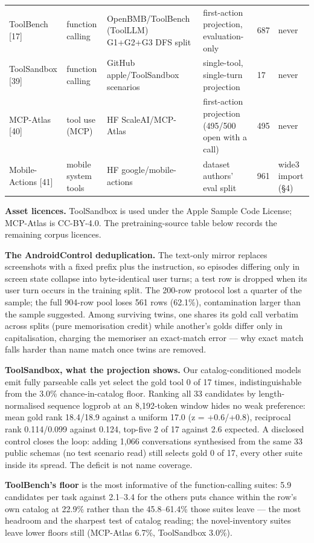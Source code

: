 \documentclass{article}
\begin{document}
\begin{table}[htbp]
\begin{tabularx}{\textwidth}{ll>{\raggedright\arraybackslash}X>{\raggedright\arraybackslash}Xll}
ToolBench [17] & function calling & OpenBMB/ToolBench (ToolLLM) G1+G2+G3 DFS split & first-action projection, evaluation-only & 687 & never \\
ToolSandbox [39] & function calling & GitHub {\scriptsize apple/ToolSandbox} scenarios & single-tool, single-turn projection & 17 & never \\
MCP-Atlas [40] & tool use (MCP) & HF {\scriptsize ScaleAI/MCP-Atlas} & first-action projection (495/500 open with a call) & 495 & never \\
Mobile-Actions [41] & mobile system tools & HF {\scriptsize google/mobile-actions} & dataset authors' eval split & 961 & wide3 import (\S4) \\
\bottomrule
\end{tabularx}
\end{table}


\textbf{Asset licences.} ToolSandbox is used under the Apple Sample Code License; MCP-Atlas is
CC-BY-4.0. The pretraining-source table below records the remaining corpus licences.


\textbf{The AndroidControl deduplication.} The text-only mirror replaces screenshots with a
fixed prefix plus the instruction, so episodes differing only in screen state collapse into
byte-identical user turns; a test row is dropped when its user turn occurs in the training
split. The 200-row protocol lost a quarter of the sample; the full 904-row pool loses
561 rows (62.1\%), contamination larger than the sample suggested. Among surviving twins, one
shares its gold call verbatim across splits (pure memorisation credit) while another's golds
differ only in capitalisation, charging the memoriser an exact-match error --- why exact
match falls harder than name match once twins are removed.


\textbf{ToolSandbox, what the projection shows.} Our catalog-conditioned models emit fully parseable calls yet select the gold tool 0 of 17 times, indistinguishable from the 3.0\% chance-in-catalog floor. Ranking all 33 candidates by length-normalised sequence logprob at an 8,192-token window hides no weak preference: mean gold rank 18.4/18.9 against a uniform 17.0 (z = +0.6/+0.8), reciprocal rank 0.114/0.099 against 0.124, top-five 2 of 17 against 2.6 expected. A disclosed control closes the loop: adding 1,066 conversations synthesised from the same 33 public schemas (no test scenario read) still selects gold 0 of 17, every other suite inside its spread. The deficit is not name coverage.


\textbf{ToolBench's floor} is the most informative of the function-calling suites: 5.9
candidates per task against 2.1--3.4 for the others puts chance within the row's own catalog
at 22.9\% rather than the 45.8--61.4\% those suites leave --- the most headroom and the
sharpest test of catalog reading; the
novel-inventory suites leave lower floors still (MCP-Atlas 6.7\%, ToolSandbox 3.0\%).
\end{document}
